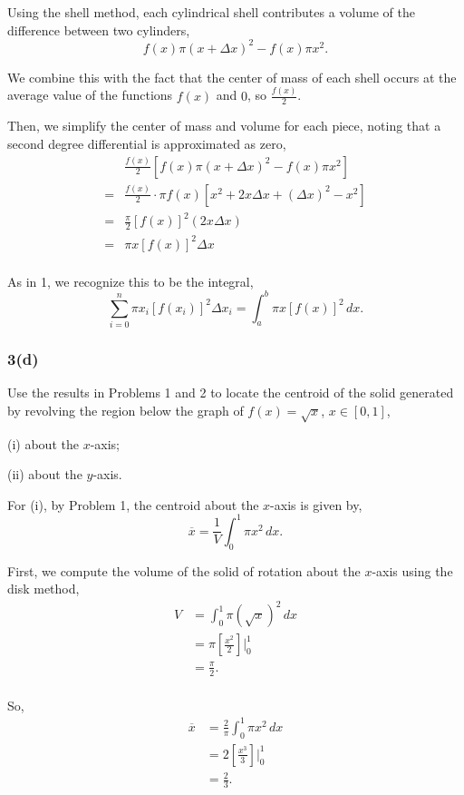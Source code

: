 \documentclass[../hw7.tex]{subfiles}
\begin{document}
Using the shell method, each cylindrical shell contributes a volume of the difference between two cylinders, 
\[f(x)\pi{(x+\Delta x)}^2-f(x)\pi x^2.\]

We combine this with the fact that the center of mass of each shell occurs at the average value of the functions $f(x)$ and $0$, so $\frac{f(x)}{2}$.

Then, we simplify the center of mass and volume for each piece, noting that a second degree differential is approximated as zero,
\begin{align*}
    &\frac{f(x)}{2}\left[ f(x)\pi{(x+\Delta x)}^2-f(x)\pi x^2 \right] \\
    =& \frac{f(x)}{2} \cdot \pi f(x) \left[ x^2+2x\Delta x+ {(\Delta x)}^2 -x^2 \right] \\
    =& \frac{\pi}{2} {[f(x)]}^2 (2x\Delta x) \\
    =& \pi x {[f(x)]}^2 \Delta x \\
\end{align*}

As in 1, we recognize this to be the integral,
\[\sum\limits_{i=0}^{n} \pi x_i {[f(x_i)]}^2 \Delta x_i = \int_{a}^{b} \pi x {[f(x)]}^2\,dx.\]

\subsubsection*{3(d)}
Use the results in Problems 1 and 2 to locate the centroid of the solid generated by revolving the region below the graph of $f(x)=\sqrt{x}$, $x\in[0,1]$,

(i) about the $x$-axis;

(ii) about the $y$-axis.


For (i), by Problem 1, the centroid about the $x$-axis is given by,
\[\overline{x} = \frac{1}{V} \int_{0}^{1} \pi x^2\,dx.\]

First, we compute the volume of the solid of rotation about the $x$-axis using the disk method,
\begin{align*}
    V&=\int_{0}^{1}\pi{(\sqrt{x})}^2\,dx\\
    &=\pi\left[ \frac{x^2}{2} \right] \Bigg\vert_{0}^{1} \\
    &= \frac{\pi}{2}. \\
\end{align*}

So,
\begin{align*}
    \overline{x} &= \frac{2}{\pi} \int_{0}^{1} \pi x^2\,dx \\
    &= 2 \left[ \frac{x^3}{3} \right] \Bigg\vert_{0}^{1} \\
    &= \frac{2}{3}.
\end{align*}
\end{document}
